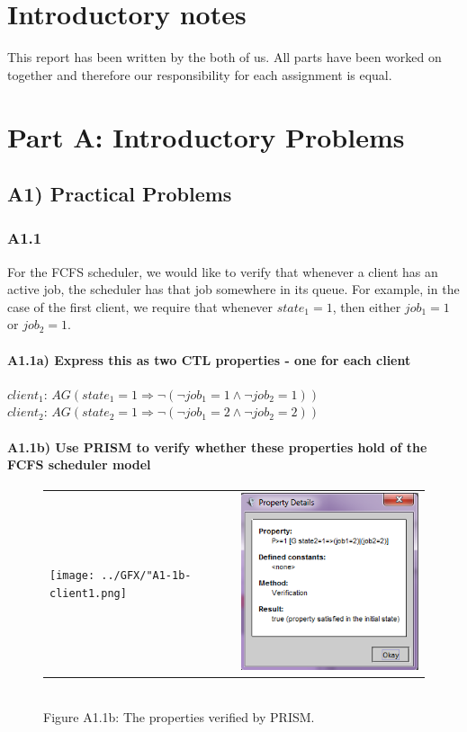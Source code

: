 \documentclass[12pt]{report}
\begin{document}
\chapter*{Introductory notes}
This report has been written by the both of us. All parts have been worked on together and therefore our responsibility for each assignment is equal.
\chapter*{Part A: Introductory Problems}
\section*{A1) Practical Problems}

\subsection*{A1.1}
For the FCFS scheduler, we would like to verify that whenever a client has an active job, the scheduler has that job somewhere in its queue. For example, in the case of the first client, we require that whenever $state_1 = 1$, then either $job_1 = 1$ or $job_2 = 1$.

\subsubsection*{A1.1a) Express this as two CTL properties - one for each client}
$client_1$: $AG (state_1 = 1 \Rightarrow \neg(\neg job_1 = 1 \wedge \neg job_2 = 1))$\\
$client_2$: $AG (state_2 = 1 \Rightarrow \neg(\neg job_1 = 2 \wedge \neg job_2 = 2))$

\subsubsection*{A1.1b) Use PRISM to verify whether these properties hold of the FCFS scheduler model}
\begin{figure}[H]
			\centering
			\begin{tabular}{ l r }
				\texttt{[image: ../GFX/"A1-1b-client1.png]}
				& \includegraphics[scale=0.75]{../GFX/A1-1b-client2.png}
			\end{tabular}\\
			Figure A1.1b: The properties verified by PRISM.
		\end{figure}
\end{document}
